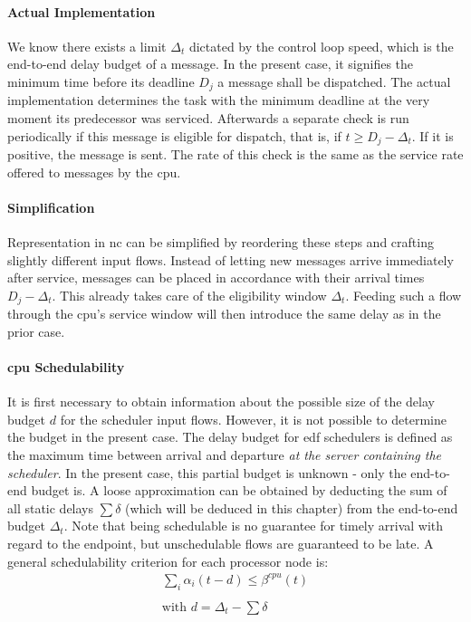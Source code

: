 \paragraph{Actual Implementation}
We know there exists a limit $\Delta_t$ dictated by the control loop speed, which is the end-to-end delay budget of a message. In the present case, it signifies the minimum time before
its deadline $D_j$ a message shall be dispatched.
The actual implementation determines the task with the minimum deadline at the very moment its predecessor was serviced.
Afterwards a separate check is run periodically if this message is eligible for dispatch, that is, if $t \ge D_j - \Delta_t$. If it is positive, the message is sent.
The rate of this check is the same as the service rate offered to messages by the \gls{cpu}.
\paragraph{Simplification}
Representation in \gls{nc} can be simplified by reordering these steps and crafting slightly different input flows. Instead of letting new messages arrive immediately after service,
messages can be placed in accordance with their arrival times $D_j - \Delta_t$. This already takes care of the eligibility window $\Delta_t$.
Feeding such a flow through the \gls{cpu}'s service window will then introduce the same delay as in the prior case.

\paragraph{\gls{cpu} Schedulability}
It is first necessary to obtain information about the possible size of the delay budget $d$ for the scheduler input flows. However, it is not possible to determine the budget in the present case.
The delay budget for \gls{edf} schedulers is defined as the maximum time between arrival and departure \emph{at the server containing the scheduler}. In the present case, this partial budget is unknown -
only the end-to-end budget is. A loose approximation can be obtained by deducting the sum of all static delays $\sum \delta$ (which will be deduced in this chapter) from the end-to-end budget $\Delta_t$.
Note that being schedulable is no guarantee for timely arrival with regard to the endpoint, but unschedulable flows are guaranteed to be late.
A general schedulability criterion for each processor node is:
%
\begin{equation}
\begin{aligned}
\sum_i \alpha_i(t-d) \le \beta^{cpu}(t)\\
\\
\text{with~} d = \Delta_t - \sum \delta
\label{eq:cpu_min_d}
\end{aligned}
\end{equation}
%


